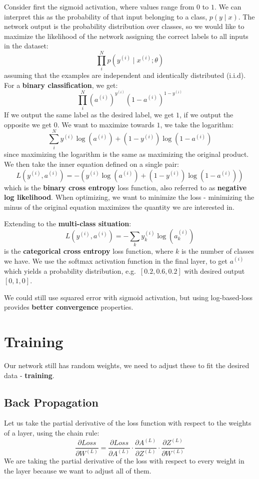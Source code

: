 \documentclass[11pt]{article}
\begin{document}
Consider first the sigmoid activation, where values range from $0$ to $1$.
We can interpret this as the probability of that input belonging to a class, $p(y \mid x)$.
The network output is the probability distribution over classes, so we would like to maximize the likelihood of the network assigning the correct labels to all inputs in the dataset:
\[
  \prod_i^N p(y^{(i)} \mid x^{(i)}; \theta) 
\]
assuming that the examples are independent and identically distributed (i.i.d).
For a \textbf{binary classification}, we get:
\[
  \prod_i^N (a^{(i)})^{y^{(i)}} (1 - a^{(i)})^{1 - y^{(i)}}
\]
If we output the same label as the desired label, we get $1$, if we output the opposite we get $0$.
We want to maximize towards $1$, we take the logarithm:
\[
  \sum_i^N y^{(i)}\log(a^{(i)}) + (1 - y^{(i)}) \log(1 - a^{(i)})
\]
since maximizing the logarithm is the same as maximizing the original product.
We then take the inner equation defined on a single pair:
\[
  L(y^{(i)}, a^{(i)}) = -(y^{(i)}\log(a^{(i)}) + (1 - y^{(i)}) \log(1 - a^{(i)}))
\]
which is the \textbf{binary cross entropy} loss function, also referred to as \textbf{negative log likelihood}.
When optimizing, we want to minimize the loss - minimizing the minus of the original equation maximizes the quantity we are interested in.

Extending to the \textbf{multi-class situation}:
\[
  L(y^{(i)}, a^{(i)}) = -\sum_k y_k^{(i)}\log(a_k^{(i)})
\]
is the \textbf{categorical cross entropy} loss function, where $k$ is the number of classes we have.
We use the softmax activation function in the final layer, to get $a^{(i)}$ which yields a probability distribution, e.g.\ $[0.2, 0.6, 0.2]$ with desired output $[0, 1, 0]$.

We could still use squared error with sigmoid activation, but using log-based-loss provides \textbf{better convergence} properties.

\section{Training}
Our network still has random weights, we need to adjust these to fit the desired data - \textbf{training}.

\subsection{Back Propagation}
Let us take the partial derivative of the loss function with respect to the weights of a layer, using the chain rule:
\[
  \frac{\partial Loss}{\partial W^{(L)}} = \frac{\partial Loss}{\partial A^{(L)}} \cdot \frac{\partial A^{(L)}}{\partial Z^{(L)}} \cdot \frac{\partial Z^{(L)}}{\partial W^{(L)}}
\]
We are taking the partial derivative of the loss with respect to every weight in the layer because we want to adjust all of them.
\end{document}
